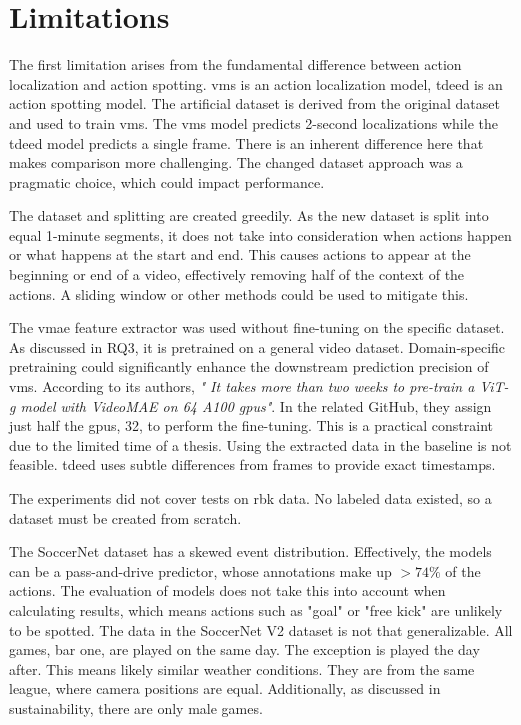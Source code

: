 \section{Limitations}


The first limitation arises from the fundamental difference between action localization and action spotting. \acrshort{vms} is an action localization model, \acrshort{tdeed} is an action spotting model. The artificial dataset is derived from the original dataset and used to train \acrshort{vms}. The \acrshort{vms} model predicts 2-second localizations while the \acrshort{tdeed} model predicts a single frame. There is an inherent difference here that makes comparison more challenging. The changed dataset approach was a pragmatic choice, which could impact performance. 

The dataset and splitting are created greedily. As the new dataset is split into equal 1-minute segments, it does not take into consideration when actions happen or what happens at the start and end. This causes actions to appear at the beginning or end of a video, effectively removing half of the context of the actions. A sliding window or other methods could be used to mitigate this. 

The \acrshort{vmae} feature extractor was used without fine-tuning on the specific dataset. As discussed in RQ3, it is pretrained on a general video dataset. Domain-specific pretraining could significantly enhance the downstream prediction precision of \acrshort{vms}. According to its authors, \textit{" It takes more than two weeks to pre-train a ViT-g model with VideoMAE on 64 A100 \acrshort{gpu}s"}\cite{wang_videomae_2023}. In the related GitHub, they assign just half the \acrshort{gpu}s, 32, to perform the fine-tuning. This is a practical constraint due to the limited time of a thesis. Using the extracted data in the baseline is not feasible. \acrshort{tdeed} uses subtle differences from frames to provide exact timestamps. 

The experiments did not cover tests on \acrfull{rbk} data. No labeled data existed, so a dataset must be created from scratch. 

The SoccerNet dataset has a skewed event distribution. Effectively, the models can be a pass-and-drive predictor, whose annotations make up $>74\%$ of the actions. The evaluation of models does not take this into account when calculating results, which means actions such as "goal" or "free kick" are unlikely to be spotted. The data in the SoccerNet V2 dataset is not that generalizable. All games, bar one, are played on the same day. The exception is played the day after. This means likely similar weather conditions. They are from the same league, where camera positions are equal. Additionally, as discussed in sustainability, there are only male games. 


